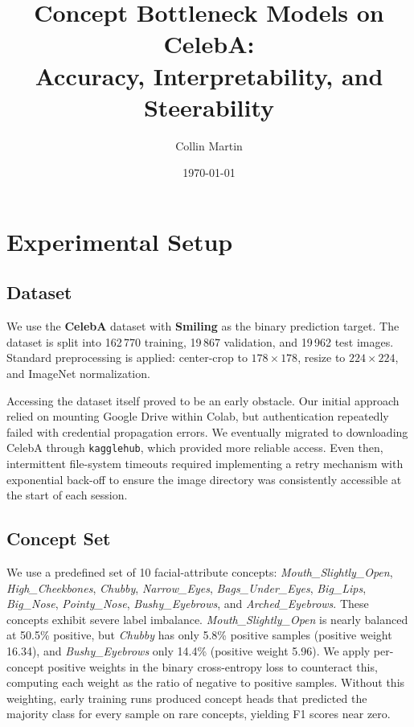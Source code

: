 \documentclass[11pt,a4paper]{article}
\title{Concept Bottleneck Models on CelebA:\\
       Accuracy, Interpretability, and Steerability}
\author{Collin Martin}
\affil{Neural Networks -- Project I (Heavy Version)}
\date{\today}
\begin{document}
\maketitle

\section{Experimental Setup}

\subsection{Dataset}

We use the \textbf{CelebA} dataset with \textbf{Smiling} as the binary prediction target. The dataset is split into 162\,770 training, 19\,867 validation, and 19\,962 test images. Standard preprocessing is applied: center-crop to $178 \times 178$, resize to $224 \times 224$, and ImageNet normalization.

Accessing the dataset itself proved to be an early obstacle. Our initial approach relied on mounting Google Drive within Colab, but authentication repeatedly failed with credential propagation errors. We eventually migrated to downloading CelebA through \texttt{kagglehub}, which provided more reliable access. Even then, intermittent file-system timeouts required implementing a retry mechanism with exponential back-off to ensure the image directory was consistently accessible at the start of each session.

\subsection{Concept Set}

We use a predefined set of 10 facial-attribute concepts: \emph{Mouth\_Slightly\_Open}, \emph{High\_Cheekbones}, \emph{Chubby}, \emph{Narrow\_Eyes}, \emph{Bags\_Under\_Eyes}, \emph{Big\_Lips}, \emph{Big\_Nose}, \emph{Pointy\_Nose}, \emph{Bushy\_Eyebrows}, and \emph{Arched\_Eyebrows}. These concepts exhibit severe label imbalance. \emph{Mouth\_Slightly\_Open} is nearly balanced at 50.5\% positive, but \emph{Chubby} has only 5.8\% positive samples (positive weight 16.34), and \emph{Bushy\_Eyebrows} only 14.4\% (positive weight 5.96). We apply per-concept positive weights in the binary cross-entropy loss to counteract this, computing each weight as the ratio of negative to positive samples. Without this weighting, early training runs produced concept heads that predicted the majority class for every sample on rare concepts, yielding F1 scores near zero.
\end{document}
